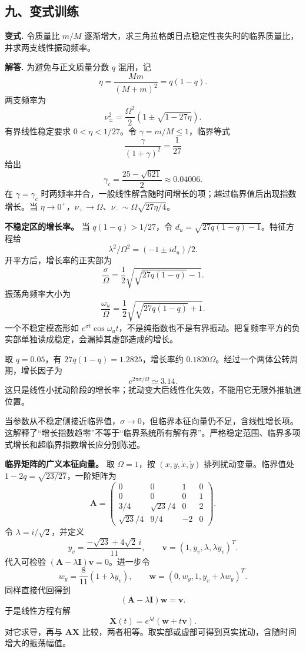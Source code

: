 \documentclass[12pt,a4paper,UTF8]{ctexart}
\begin{document}
\subsection{九、变式训练}\label{ux4e5dux53d8ux5f0fux8badux7ec3-3}

\textbf{变式.} 令质量比 \(m/M\)
逐渐增大，求三角拉格朗日点稳定性丧失时的临界质量比，并求两支线性振动频率。

\textbf{解答.} 为避免与正文质量分数 \(q\) 混用，记 \[
\eta=\frac{Mm}{(M+m)^2}=q(1-q).
\] 两支频率为 \[
\boxed{\nu_\pm^2=\frac{\Omega^2}{2}
\left(1\pm\sqrt{1-27\eta}\right)}.
\] 有界线性稳定要求 \(0<\eta<1/27\)。令 \(\gamma=m/M\le1\)，临界等式 \[
\frac{\gamma}{(1+\gamma)^2}=\frac1{27}
\] 给出 \[
\boxed{\gamma_c=\frac{25-\sqrt{621}}2\approx0.04006}.
\] 在 \(\gamma=\gamma_c\)
时两频率并合，一般线性解含随时间增长的项；越过临界值后出现指数增长。当
\(\eta\to0^+\)，\(\nu_+\to\Omega\)、\(\nu_-\sim\Omega\sqrt{27\eta/4}\)。

\textbf{不稳定区的增长率。} 当 \(q(1-q)>1/27\)，令
\(d_u=\sqrt{27q(1-q)-1}\)。特征方程给 \[
\lambda^2/\Omega^2=(-1\pm i d_u)/2.
\] 开平方后，增长率的正实部为 \[
\frac{\sigma}{\Omega}=\frac12
\sqrt{\sqrt{27q(1-q)}-1}.
\] 振荡角频率大小为 \[
\frac{\omega_u}{\Omega}=\frac12
\sqrt{\sqrt{27q(1-q)}+1}.
\] 一个不稳定模态形如
\(e^{\sigma t}\cos\omega_ut\)，不是纯指数也不是有界振动。把复频率平方的负实部单独读成稳定，会漏掉其虚部造成的增长。

取 \(q=0.05\)，有 \(27q(1-q)=1.2825\)，增长率约
\(0.1820\Omega\)。经过一个两体公转周期，增长因子为 \[
e^{2\pi\sigma/\Omega}\simeq3.14.
\]
这只是线性小扰动阶段的增长率；扰动变大后线性化失效，不能用它无限外推轨道位置。

当参数从不稳定侧接近临界值，\(\sigma\to0\)，但临界本征向量仍不足，含线性增长项。这解释了``增长指数趋零''不等于``临界系统所有解有界''。严格稳定范围、临界多项式增长和超临界指数增长应分别陈述。

\textbf{临界矩阵的广义本征向量。} 取 \(\Omega=1\)，按
\((x,y,\dot x,\dot y)\) 排列扰动变量。临界值处
\(1-2q=\sqrt{23/27}\)，一阶矩阵为 \[
\bm A=\begin{pmatrix}
0&0&1&0\\0&0&0&1\\
3/4&\sqrt{23}/4&0&2\\
\sqrt{23}/4&9/4&-2&0
\end{pmatrix}.
\] 令 \(\lambda=i/\sqrt2\)，并定义 \[
y_v=\frac{-\sqrt{23}+4\sqrt2\,i}{11},
\qquad\bm v=(1,y_v,\lambda,\lambda y_v)^T.
\] 代入可检验 \((\bm A-\lambda\bm I)\bm v=0\)。进一步令 \[
w_y=\frac8{11}(1+\lambda y_v),
\qquad\bm w=(0,w_y,1,y_v+\lambda w_y)^T.
\] 同样直接代回得到 \[
(\bm A-\lambda\bm I)\bm w=\bm v.
\] 于是线性方程有解 \[
\bm X(t)=e^{\lambda t}(\bm w+t\bm v).
\] 对它求导，再与 \(\bm A\bm X\)
比较，两者相等。取实部或虚部可得到真实扰动，含随时间增大的振荡幅值。
\end{document}
